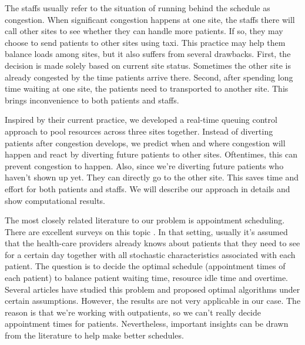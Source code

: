 The staffs usually refer to the situation of running behind the schedule
as congestion. When significant congestion happens at one site, the staffs there
will call other sites to see whether they can handle more patients. If so,
 they may choose to send patients to other sites using taxi. This practice
may help them balance loads among sites, but it also suffers from several
drawbacks. First, the decision is made solely based on current site status.
Sometimes the other site is already congested by the time patients arrive
there. Second, after spending long time waiting at one site, the patients
need to transported to another site. This brings inconvenience to both
patients and staffs.

Inspired by their current practice, we developed a real-time queuing control
approach to pool resources across three sites together. Instead of diverting
patients after congestion develops, we predict when and where congestion will
happen and react by diverting future patients to other sites. Oftentimes, this
can prevent congestion to happen. Also, since we're diverting future patients
who haven't shown up yet. They can directly go to the other site. This saves
time and effort for both patients and staffs. We will describe our approach
in details and show computational results.


The most closely related literature to our problem is appointment scheduling.
There are excellent surveys on this topic \cite{gupta2008appointment, cayirli2003outpatient}.
In that setting, usually it's assumed that the health-care providers
already knows about patients that they need to see for a certain day
together with all stochastic characteristics associated with each patient.
The question is to decide the optimal schedule (appointment times of
each patient) to balance patient waiting time, resource idle time and
overtime. Several articles \cite{kaandorp2007optimal,denton2003sequential,begen2011appointment}
have studied this problem and proposed optimal algorithms under
certain assumptions. However, the results are not very applicable
in our case. The reason is that we're working with outpatients,
so we can't really decide appointment times for patients. Nevertheless,
important insights can be drawn from the literature to help make
better schedules.
